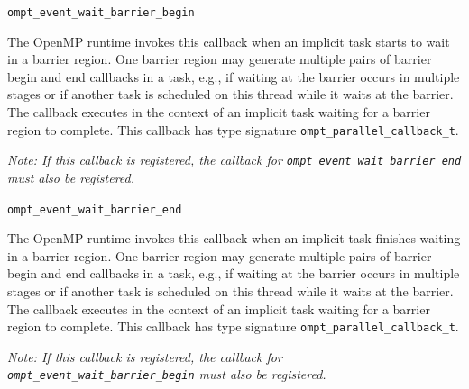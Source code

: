 \documentclass{article}
\newcommand{\descheader}[1]{{\needspace{3\baselineskip}\vspace{1em}\noindent \fbox{#1}}}
\begin{document}
\begin{description}

\item \verb|ompt_event_wait_barrier_begin|

   The OpenMP runtime invokes this callback 
when an implicit task starts to
   wait in a barrier region. 
    One barrier region may generate multiple pairs of barrier begin and end 
callbacks in a task, e.g., if waiting at the barrier occurs in multiple stages or if another task is scheduled on this thread while it waits at the barrier. 
The callback executes in
   the context of an implicit task waiting for a barrier region to complete. %
This callback has type signature \verb|ompt_parallel_callback_t|. 

{\em Note: If this callback is registered, the
   callback for \verb|ompt_event_wait_barrier_end| must also be registered.}

\item \verb|ompt_event_wait_barrier_end|

\sloppy
   The OpenMP runtime invokes this callback 
when an implicit task finishes
   waiting in a barrier region. One barrier region may generate multiple pairs of barrier
begin and end callbacks in a task, e.g., if waiting at
   the barrier occurs in multiple stages or if another task is scheduled on this thread while it waits at the barrier.  The callback executes in
   the context of an implicit task waiting for a barrier region to complete. %
This callback has type signature \verb|ompt_parallel_callback_t|. 

{\em Note: If this callback is registered, the
   callback for \verb|ompt_event_wait_barrier_begin| must also be registered.}

\end{description}


\descheader{Taskwait Idling}
\end{document}
